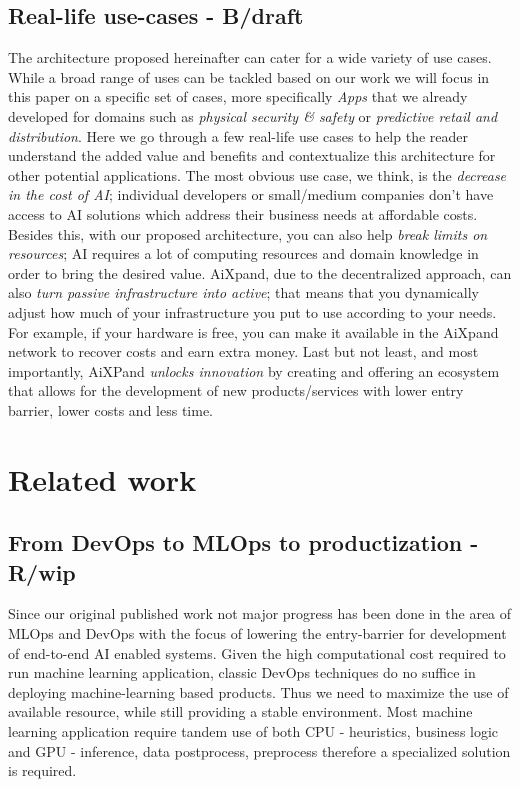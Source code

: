\documentclass{article}
\begin{document}
\subsection{Real-life use-cases - B/draft}
The architecture proposed hereinafter can cater for a wide variety of use cases. While a broad range of uses can be tackled based on our work we will focus in this paper on a specific set of cases, more specifically \textit{Apps} that we already developed for domains such as \textit{physical security \& safety} or \textit{predictive retail and distribution}. Here we go through a few real-life use cases to help the reader understand the added value and benefits and contextualize this architecture for other potential applications. The most obvious use case, we think, is the \emph{decrease in the cost of AI}; individual developers or small/medium companies don't have access to AI solutions which address their business needs at affordable costs. Besides this, with our proposed architecture, you can also help \emph{break limits on resources}; AI requires a lot of computing resources and domain knowledge in order to bring the desired value. AiXpand, due to the decentralized approach, can also \emph{turn passive infrastructure into active}; that means that you dynamically adjust how much of your infrastructure you put to use according to your needs. For example, if your hardware is free, you can make it available in the AiXpand network to recover costs and earn extra money. Last but not least, and most importantly, AiXPand \emph{unlocks innovation} by creating and offering an ecosystem that allows for the development of new products/services with lower entry barrier, lower costs and less time. 
\newline

\section{Related work}
\subsection{From DevOps to MLOps to productization - R/wip}
Since our original published work\cite{ciobanu2021solis} not major progress has been done in the area of MLOps and DevOps with the focus of lowering the entry-barrier for development of end-to-end AI enabled systems.
Given the high computational cost required to run machine learning application, classic DevOps techniques do no suffice in deploying machine-learning based products. Thus we need to maximize the use of available resource, while still providing a stable environment. Most machine learning application require tandem use of both CPU - heuristics, business logic and GPU - inference, data postprocess, preprocess therefore a specialized solution is required.
\end{document}
